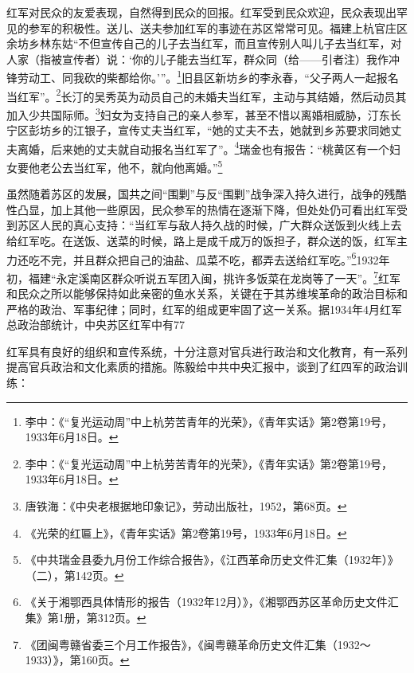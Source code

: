 红军对民众的友爱表现，自然得到民众的回报。红军受到民众欢迎，民众表现出罕见的参军的积极性。送儿、送夫参加红军的事迹在苏区常常可见。福建上杭官庄区余坊乡林东姑“不但宣传自己的儿子去当红军，而且宣传别人叫儿子去当红军，对人家（指被宣传者）说：‘你的儿子能去当红军，群众同（给——引者注）我作冲锋劳动工、同我砍的柴都给你。’”。\footnote{李中：《“复光运动周”中上杭劳苦青年的光荣》，《青年实话》第2卷第19号，1933年6月18日。}旧县区新坊乡的李永春，“父子两人一起报名当红军”。\footnote{李中：《“复光运动周”中上杭劳苦青年的光荣》，《青年实话》第2卷第19号，1933年6月18日。}长汀的吴秀英为动员自己的未婚夫当红军，主动与其结婚，然后动员其加入少共国际师。\footnote{唐铁海：《中央老根据地印象记》，劳动出版社，1952，第68页。}妇女为支持自己的亲人参军，甚至不惜以离婚相威胁，汀东长宁区彭坊乡的江银子，宣传丈夫当红军，“她的丈夫不去，她就到乡苏要求同她丈夫离婚，后来她的丈夫就自动报名当红军了”。\footnote{《光荣的红匾上》，《青年实话》第2卷第19号，1933年6月18日。}瑞金也有报告：“桃黄区有一个妇女要他老公去当红军，他不，就向他离婚。”\footnote{《中共瑞金县委九月份工作综合报告》，《江西革命历史文件汇集（1932年）》（二），第142页。}


虽然随着苏区的发展，国共之间“围剿”与反“围剿”战争深入持久进行，战争的残酷性凸显，加上其他一些原因，民众参军的热情在逐渐下降，但处处仍可看出红军受到苏区人民的真心支持：“当红军与敌人持久战的时候，广大群众送饭到火线上去给红军吃。在送饭、送菜的时候，路上是成千成万的饭担子，群众送的饭，红军主力还吃不完，并且群众把自己的油盐、瓜菜不吃，都弄去送给红军吃。”\footnote{《关于湘鄂西具体情形的报告（1932年12月）》，《湘鄂西苏区革命历史文件汇集》第1册，第312页。}1932年初，福建“永定溪南区群众听说五军团入闽，挑许多饭菜在龙岗等了一天”。\footnote{《团闽粤赣省委三个月工作报告》，《闽粤赣革命历史文件汇集（1932～1933）》，第160页。}红军和民众之所以能够保持如此亲密的鱼水关系，关键在于其苏维埃革命的政治目标和严格的政治、军事纪律；同时，红军的组成更牢固了这一关系。据1934年4月红军总政治部统计，中央苏区红军中有77%


红军具有良好的组织和宣传系统，十分注意对官兵进行政治和文化教育，有一系列提高官兵政治和文化素质的措施。陈毅给中共中央汇报中，谈到了红四军的政治训练：

